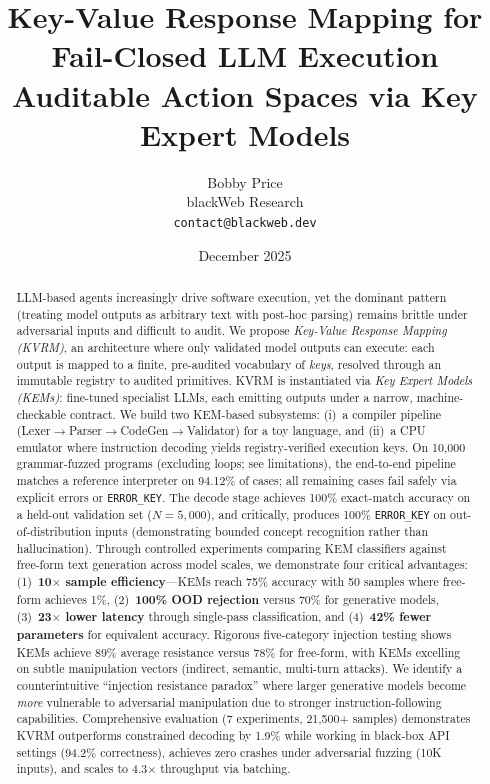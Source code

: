 \documentclass[11pt]{article}
\title{\textbf{Key-Value Response Mapping for Fail-Closed LLM Execution}\\
\large Auditable Action Spaces via Key Expert Models}
\author{Bobby Price\\blackWeb Research\\\texttt{contact@blackweb.dev}}
\date{December 2025}
\begin{document}
\maketitle

\begin{abstract}
LLM-based agents increasingly drive software execution, yet the dominant pattern (treating model outputs as arbitrary text with post-hoc parsing) remains brittle under adversarial inputs and difficult to audit.
We propose \emph{Key-Value Response Mapping (KVRM)}, an architecture where only validated model outputs can execute: each output is mapped to a finite, pre-audited vocabulary of \emph{keys}, resolved through an immutable registry to audited primitives.
KVRM is instantiated via \emph{Key Expert Models (KEMs)}: fine-tuned specialist LLMs, each emitting outputs under a narrow, machine-checkable contract.
We build two KEM-based subsystems: (i)~a compiler pipeline (Lexer$\rightarrow$Parser$\rightarrow$CodeGen$\rightarrow$Validator) for a toy language, and (ii)~a CPU emulator where instruction decoding yields registry-verified execution keys.
On 10{,}000 grammar-fuzzed programs (excluding loops; see limitations), the end-to-end pipeline matches a reference interpreter on 94.12\% of cases; all remaining cases fail safely via explicit errors or \texttt{ERROR\_KEY}. The decode stage achieves 100\% exact-match accuracy on a held-out validation set ($N{=}5{,}000$), and critically, produces 100\% \texttt{ERROR\_KEY} on out-of-distribution inputs (demonstrating bounded concept recognition rather than hallucination).
Through controlled experiments comparing KEM classifiers against free-form text generation across model scales, we demonstrate four critical advantages: (1)~\textbf{10$\times$ sample efficiency}---KEMs reach 75\% accuracy with 50 samples where free-form achieves 1\%, (2)~\textbf{100\% OOD rejection} versus 70\% for generative models, (3)~\textbf{23$\times$ lower latency} through single-pass classification, and (4)~\textbf{42\% fewer parameters} for equivalent accuracy.
Rigorous five-category injection testing shows KEMs achieve 89\% average resistance versus 78\% for free-form, with KEMs excelling on subtle manipulation vectors (indirect, semantic, multi-turn attacks).
We identify a counterintuitive ``injection resistance paradox'' where larger generative models become \emph{more} vulnerable to adversarial manipulation due to stronger instruction-following capabilities.
Comprehensive evaluation (7 experiments, 21{,}500+ samples) demonstrates KVRM outperforms constrained decoding by 1.9\% while working in black-box API settings (94.2\% correctness), achieves zero crashes under adversarial fuzzing (10K inputs), and scales to 4.3$\times$ throughput via batching.

\end{abstract}
\end{document}
